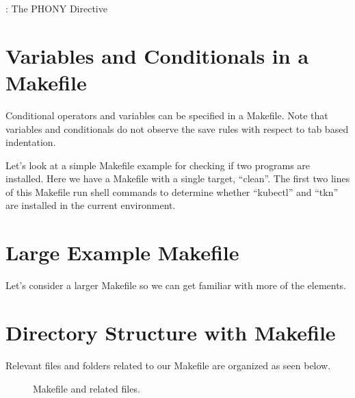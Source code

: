 \justifying
\begin{mybox}{\thetcbcounter: The PHONY Directive}
	
\end{mybox}


\section{Variables and Conditionals in a Makefile}

\justifying
Conditional operators and variables can be specified in a Makefile. Note that variables and conditionals do not observe the save rules with respect to tab based indentation.

\justifying
Let's look at a simple Makefile example for checking if two programs are installed. Here we have a Makefile
with a single target, ``clean''. The first two lines of this Makefile run shell commands to determine
whether ``kubectl'' and ``tkn'' are installed in the current environment.

\begin{mybox}{\thetcbcounter: Conditionals and Variable Example}
	}}code/23-makefiles/6b-Makefile}
\end{mybox}

\section{Large Example Makefile}
\justifying
Let's consider a larger Makefile so we can get familiar with more of the elements.

\section{Directory Structure with Makefile}

\justifying
Relevant files and folders related to our Makefile are organized as seen below.

\begin{figure}[!htb]
	
	\caption{Makefile and related files.}
\label{makefile}
\end{figure}

